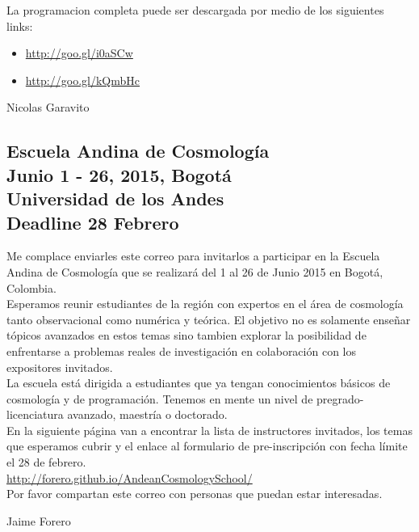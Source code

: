 \documentclass{book}
\begin{document}
\noindent La programacion completa puede ser descargada por medio de los siguientes links:

\begin{itemize}
\item \url{http://goo.gl/i0aSCw}
\item \url{http://goo.gl/kQmbHc}
\end{itemize}


\begin{flushright}
Nicolas Garavito
\end{flushright}

\subsection{Escuela Andina de Cosmología\\ Junio 1 - 26, 2015, Bogotá\\ Universidad de los Andes\\ Deadline 28 Febrero}

Me complace enviarles este correo para invitarlos a participar en la Escuela Andina de Cosmología que se realizará del 1 al 26 de Junio 2015 en Bogotá, Colombia.\\

\noindent Esperamos reunir estudiantes de la región con expertos en el área de cosmología tanto observacional como numérica y teórica.
El objetivo no es solamente enseñar tópicos avanzados en estos temas sino tambien explorar la posibilidad de enfrentarse a problemas reales de investigación en colaboración con los expositores invitados.\\

\noindent La escuela está dirigida a estudiantes que ya tengan conocimientos básicos de cosmología y de programación. Tenemos en mente un nivel de pregrado-licenciatura avanzado, maestría o doctorado.\\

\noindent En la siguiente página van a encontrar la lista de instructores invitados, los temas que esperamos cubrir y el enlace al formulario de pre-inscripción con fecha límite el 28 de febrero.\\

\noindent \url{http://forero.github.io/AndeanCosmologySchool/}\\

\noindent Por favor compartan este correo con personas que puedan estar interesadas.\\

\begin{flushright}
Jaime Forero
\end{flushright}
\end{document}
